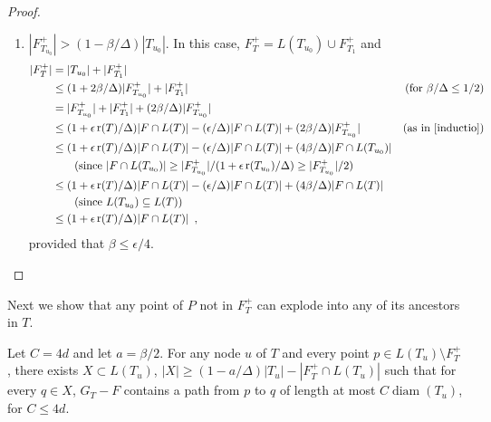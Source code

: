 \documentclass{patmorin}
\DeclareMathOperator{\rank}{r}
\DeclareMathOperator{\diam}{diam}
\begin{document}
\begin{proof}
\begin{enumerate}
\begin{enumerate}
       \item $|F^+_{T_{u_0}}| > (1-\beta/\Delta)|T_{u_0}|$. In this case, $F^+_T=L(T_{u_0}) \cup F^+_{T_1}$ and
       \begin{align*}
          |F^+_T| 
            & = |T_{u_0}| + |F^+_{T_1}| \\
            & \le (1+2\beta/\Delta)|F^+_{T_{u_0}}| + |F^+_{T_1}|
              & \text{(for $\beta/\Delta\le 1/2$)}\\
            & = |F^+_{T_{u_0}}| + |F^+_{T_1}| + (2\beta/\Delta)|F^+_{T_{u_0}}| \\
            & \le (1+\epsilon\rank(T)/\Delta)|F\cap L(T)| - (\epsilon/\Delta)|F\cap L(T)| + (2\beta/\Delta)|F^+_{T_{u_0}}| 
             & \text{(as in \eqref{inductio})} \\
            & \le (1+\epsilon\rank(T)/\Delta)|F\cap L(T)| - (\epsilon/\Delta)|F\cap L(T)| + (4\beta/\Delta)|F\cap L(T_{u_0})|  \\
              & \qquad \text{(since $|F\cap L(T_{u_0})| \ge |F^+_{T_{u_0}}|/(1+\epsilon\rank(T_{u_0})/\Delta)\ge|F^+_{T_{u_0}}|/2$)}\\
            & \le (1+\epsilon\rank(T)/\Delta)|F\cap L(T)| - (\epsilon/\Delta)|F\cap L(T)| + (4\beta/\Delta)|F\cap L(T)| \\
              & \qquad \text{(since $L(T_{u_0})\subseteq L(T)$)} \\
            & \le (1+\epsilon\rank(T)/\Delta)|F\cap L(T)| \enspace ,
       \end{align*}
       provided that $\beta \le \epsilon/4$. \qedhere
     \end{enumerate}
   \end{enumerate}
\end{proof}


Next we show that any point of $P$ not in $F^+_T$ can explode into any of its
ancestors in $T$.

\begin{clm}
  Let $C=4d$ and let $a=\beta/2$.  For any node $u$ of $T$ and
  every point $p\in L(T_u)\setminus F^+_T$, there exists $X\subset L(T_u)$,
  $|X|\ge (1-a/\Delta)|T_u|-|F^+_T\cap L(T_u)|$ such that for every $q\in X$,
  $G_T-F$ contains a path from $p$ to $q$ of length at most $C\diam(T_u)$,
  for $C\le 4d$.
\end{clm}
\end{document}
